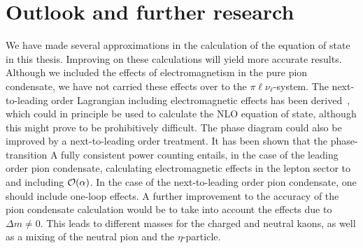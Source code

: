 \section{Outlook and further research}

We have made several approximations in the calculation of the equation of state in this thesis.
Improving on these calculations will yield more accurate results.
Although we included the effects of electromagnetism in the pure pion condensate, we have not carried these effects over to the $\pi\ell\nu_\ell$-system.
The next-to-leading order Lagrangian including electromagnetic effects has been derived~\autocite{urechVirtualPhotonsChiral1995}, which could in principle be used to calculate the NLO equation of state, although this might prove to be prohibitively difficult.
The phase diagram could also be improved by a next-to-leading order treatment.
It has been shown that the phase-transition 
A fully consistent power counting entails, in the case of the leading order pion condensate, calculating electromagnetic effects in the lepton sector to and including $\mathcal O(\alpha)$.
In the case of the next-to-leading order pion condensate, one should include one-loop effects.
A further improvement to the accuracy of the pion condensate calculation would be to take into account the effects due to $\Delta m \neq 0$.
This leads to different masses for the charged and neutral kaons, as well as a mixing of the neutral pion and the $\eta$-particle.


